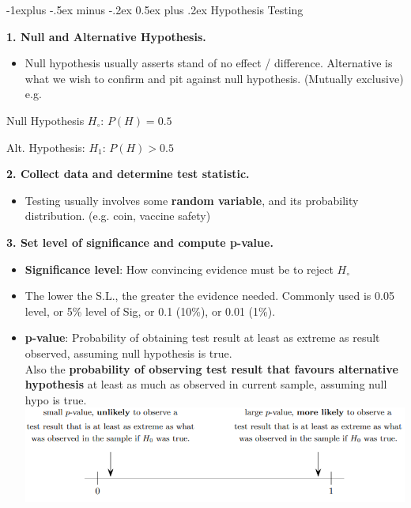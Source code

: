 \documentclass[10pt, landscape]{article}
\makeatletter
\renewcommand{\subsection}{\@startsection{subsection}{2}{0mm}%
                                {-1explus -.5ex minus -.2ex}%
                                {0.5ex plus .2ex}%
                                {\normalfont\normalsize\bfseries}}
\makeatother
\begin{document}
\begin{multicols*}{4}
\begin{itemize}
\end{itemize}

\subsection{Hypothesis Testing}

	{\small \textbf{1. Null and Alternative Hypothesis.} \\}
\begin{itemize}
	\item Null hypothesis usually asserts stand of no effect / difference. Alternative is what we wish to confirm and pit against null hypothesis. (Mutually exclusive) e.g.
\end{itemize}
	\centerline{Null Hypothesis $H_\circ$: $P(H) = 0.5$}
	\centerline{Alt. Hypothesis: $H_1$: $P(H) > 0.5 $}

	{\small \textbf{2. Collect data and determine test statistic.} \\ } 
\begin{itemize} 
	\item Testing usually involves some \textbf{random variable}, and its probability distribution. (e.g. coin, vaccine safety)
\end{itemize}

	{\small \textbf{3. Set level of significance and compute p-value.} \\ }
	\begin{itemize}
	\item \textbf{Significance level}: How convincing evidence must be to reject $H_\circ$ 
	\item The lower the S.L., the greater the evidence needed. Commonly used is 0.05 level, or 5\% level of Sig, or 0.1 (10\%), or 0.01 (1\%).
	\item \textbf{p-value}: Probability of obtaining test result at least as extreme as result observed, assuming null hypothesis is true. \\
	Also the \textbf{probability of observing test result that favours alternative hypothesis} at least as much as observed in current sample, assuming null hypo is true.
	\includegraphics[width = \linewidth]{pvalue}
\end{itemize}



\end{multicols*}
\end{document}
